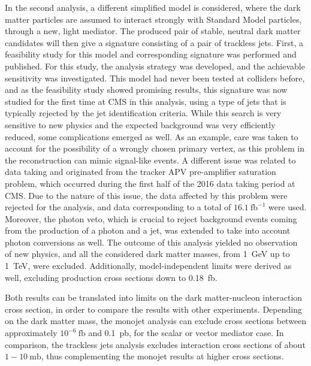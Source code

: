 In the second analysis, a different simplified model is considered, where the dark matter particles are assumed to interact strongly with Standard Model particles, through a new, light mediator. The produced pair of stable, neutral dark matter candidates will then give a signature consisting of a pair of trackless jets. First, a feasibility study for this model and corresponding signature was performed and published. For this study, the analysis strategy was developed, and the achievable sensitivity was investigated. This model had never been tested at colliders before, and as the feasibility study showed promising results, this signature was now studied for the first time at \ac{CMS} in this analysis, using a type of jets that is typically rejected by the jet identification criteria. While this search is very sensitive to new physics and the expected background was very efficiently reduced, some complications emerged as well. As an example, care was taken to account for the possibility of a wrongly chosen primary vertex, as this problem in the reconstruction can mimic signal-like events. A different issue was related to data taking and originated from the tracker APV pre-amplifier saturation problem, which occurred during the first half of the 2016 data taking period at \ac{CMS}. Due to the nature of this issue, the data affected by this problem were rejected for the analysis, and data corresponding to a total of $16.1\ \mathrm{fb}^{-1}$ were used. Moreover, the photon veto, which is crucial to reject background events coming from the production of a photon and a jet, was extended to take into account photon conversions as well. The outcome of this analysis yielded no observation of new physics, and all the considered dark matter masses, from \SI{1}{GeV} up to \SI{1}{TeV}, were excluded. Additionally, model-independent limits were derived as well, excluding production cross sections down to \SI{0.18}{fb}.

Both results can be translated into limits on the dark matter-nucleon interaction cross section, in order to compare the results with other experiments. Depending on the dark matter mass, the monojet analysis can exclude cross sections between approximately $10^{-6}\ \mathrm{fb}$ and \SI{0.1}{pb}, for the scalar or vector mediator case. In comparison, the trackless jets analysis excludes interaction cross sections of about $1-10\ \mathrm{mb}$, thus complementing the monojet results at higher cross sections.


